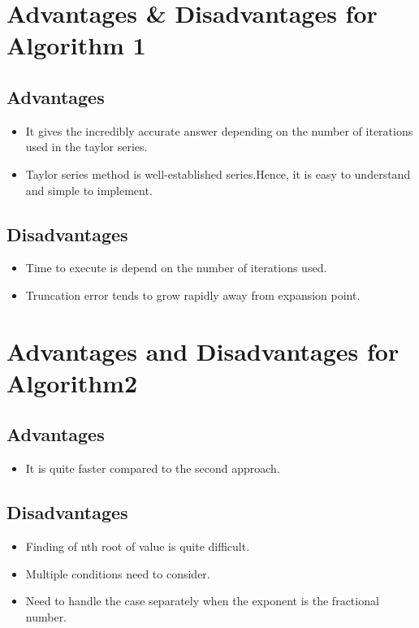 \documentclass{article}
\begin{document}
\newpage

\section{Advantages & Disadvantages for Algorithm 1}

\subsection{Advantages}

\begin{itemize}
    \item It gives the incredibly accurate answer depending on the number of iterations used in the taylor series.
    \item Taylor series method is well-established series.Hence, it is easy to understand and simple to implement.
   
    
\end{itemize}

\subsection{Disadvantages}
\begin{itemize}
    \item Time to execute is depend on the number of iterations used.
    \item Truncation error tends to grow rapidly away from expansion point.
\end{itemize}


\section{Advantages and Disadvantages for Algorithm2}
\subsection{Advantages}
\begin{itemize}
    \item It is quite faster compared to the second approach.
    
    
\end{itemize}

\subsection{Disadvantages}
\begin{itemize}
    \item Finding of nth root of value is quite difficult.
    \item Multiple conditions need to consider.
    \item Need to handle the case separately when the exponent is the fractional number.
    
    
\end{itemize}
\end{document}
